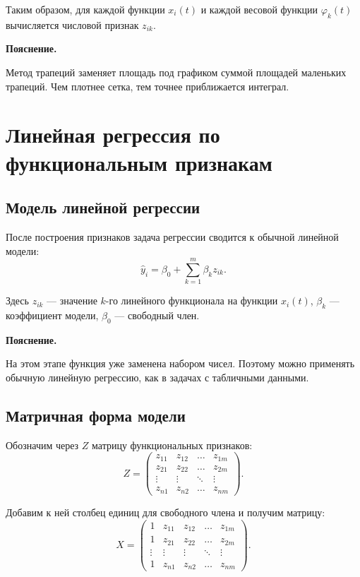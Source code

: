 \documentclass[14pt,a4paper]{extarticle}
\newenvironment{explanation}
{
    \vspace{0.2cm}
    \noindent\textbf{Пояснение.}
}
{
    \vspace{0.2cm}
}
\begin{document}
Таким образом, для каждой функции \(x_i(t)\) и каждой весовой функции \(\varphi_k(t)\) вычисляется числовой признак \(z_{ik}\).

\begin{explanation}
Метод трапеций заменяет площадь под графиком суммой площадей маленьких трапеций. Чем плотнее сетка, тем точнее приближается интеграл.
\end{explanation}


\section{Линейная регрессия по функциональным признакам}

\subsection{Модель линейной регрессии}

После построения признаков задача регрессии сводится к обычной линейной модели:
\[
\hat y_i=\beta_0+\sum_{k=1}^{m}\beta_k z_{ik}.
\]

Здесь \(z_{ik}\) — значение \(k\)-го линейного функционала на функции \(x_i(t)\), \(\beta_k\) — коэффициент модели, \(\beta_0\) — свободный член.

\begin{explanation}
На этом этапе функция уже заменена набором чисел. Поэтому можно применять обычную линейную регрессию, как в задачах с табличными данными.
\end{explanation}

\subsection{Матричная форма модели}

Обозначим через \(Z\) матрицу функциональных признаков:
\[
Z=
\begin{pmatrix}
z_{11} & z_{12} & \dots & z_{1m}\\
z_{21} & z_{22} & \dots & z_{2m}\\
\vdots & \vdots & \ddots & \vdots\\
z_{n1} & z_{n2} & \dots & z_{nm}
\end{pmatrix}.
\]

Добавим к ней столбец единиц для свободного члена и получим матрицу:
\[
X=
\begin{pmatrix}
1 & z_{11} & z_{12} & \dots & z_{1m}\\
1 & z_{21} & z_{22} & \dots & z_{2m}\\
\vdots & \vdots & \vdots & \ddots & \vdots\\
1 & z_{n1} & z_{n2} & \dots & z_{nm}
\end{pmatrix}.
\]
\end{document}
